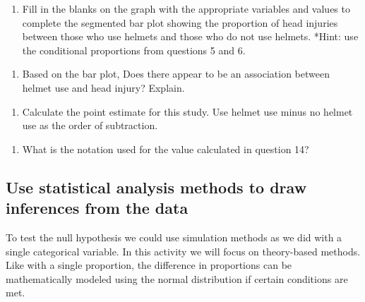 \documentclass[
]{report}
\providecommand{\tightlist}{%
  \setlength{\itemsep}{0pt}\setlength{\parskip}{0pt}}
\begin{document}
\begin{enumerate}
\def\labelenumi{\arabic{enumi}.}
\setcounter{enumi}{11}
\tightlist
\item
  Fill in the blanks on the graph with the appropriate variables and values to complete the segmented bar plot showing the proportion of head injuries between those who use helmets and those who do not use helmets. *Hint: use the conditional proportions from questions 5 and 6.
\end{enumerate}

\vspace{0.1in}

\begin{enumerate}
\def\labelenumi{\arabic{enumi}.}
\setcounter{enumi}{12}
\tightlist
\item
  Based on the bar plot, Does there appear to be an association between helmet use and head injury? Explain.
\end{enumerate}

\vspace{1in}

\begin{enumerate}
\def\labelenumi{\arabic{enumi}.}
\setcounter{enumi}{13}
\tightlist
\item
  Calculate the point estimate for this study. Use helmet use minus no helmet use as the order of subtraction.
\end{enumerate}

\vspace{1in}

\begin{enumerate}
\def\labelenumi{\arabic{enumi}.}
\setcounter{enumi}{14}
\tightlist
\item
  What is the notation used for the value calculated in question 14?
\end{enumerate}

\vspace{0.5in}

\hypertarget{use-statistical-analysis-methods-to-draw-inferences-from-the-data}{%
\subsection{Use statistical analysis methods to draw inferences from the data}\label{use-statistical-analysis-methods-to-draw-inferences-from-the-data}}

To test the null hypothesis we could use simulation methods as we did with a single categorical variable. In this activity we will focus on theory-based methods. Like with a single proportion, the difference in proportions can be mathematically modeled using the normal distribution if certain conditions are met.
\end{document}
